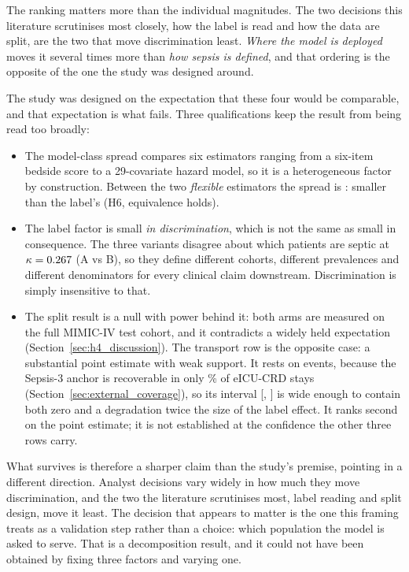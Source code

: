 The ranking matters more than the individual magnitudes. The two decisions this
literature scrutinises most closely, how the label is read and how the data are
split, are the two that move discrimination least. \emph{Where the model is
deployed} moves it several times more than \emph{how sepsis is defined}, and
that ordering is the opposite of the one the study was designed around.

The study was designed on the expectation that these four would be comparable,
and that expectation is what fails. Three qualifications keep the result from
being read too broadly:

\begin{itemize}
    \item The model-class spread compares six estimators ranging from a
          six-item bedside score to a 29-covariate hazard model, so it is a
          heterogeneous factor by construction. Between the two \emph{flexible}
          estimators the spread is \pcHSixEst{}: smaller than the label's
          (H6, equivalence holds).
    \item The label factor is small \emph{in discrimination}, which is not the
          same as small in consequence. The three variants disagree about which
          patients are septic at $\kappa = 0.267$ (A vs B), so they
          define different cohorts, different prevalences and different
          denominators for every clinical claim downstream. Discrimination is
          simply insensitive to that.
    \item The split result is a null with power behind it: both arms are
          measured on the full MIMIC-IV test cohort, and it contradicts a
          widely held expectation (Section~\ref{sec:h4_discussion}). The
          transport row is the opposite case: a substantial point estimate
          with weak support. It rests on \pcExtNEventsB{} events, because the
          Sepsis-3 anchor is recoverable in only \pcExtMicroCoverage\% of
          eICU-CRD stays (Section~\ref{sec:external_coverage}), so its interval
          [\pcHFiveCiLo, \pcHFiveCiHi] is wide enough to contain both zero and
          a degradation twice the size of the label effect. It ranks second on
          the point estimate; it is not established at the confidence the other
          three rows carry.
\end{itemize}

What survives is therefore a sharper claim than the study's premise, pointing
in a different direction. Analyst decisions vary widely in how much they move
discrimination, and the two the literature scrutinises most, label reading
and split design, move it least. The decision that appears to matter is the
one this framing treats as a validation step rather than a choice: which
population the model is asked to serve. That is a decomposition result, and it
could not have been obtained by fixing three factors and varying one.

